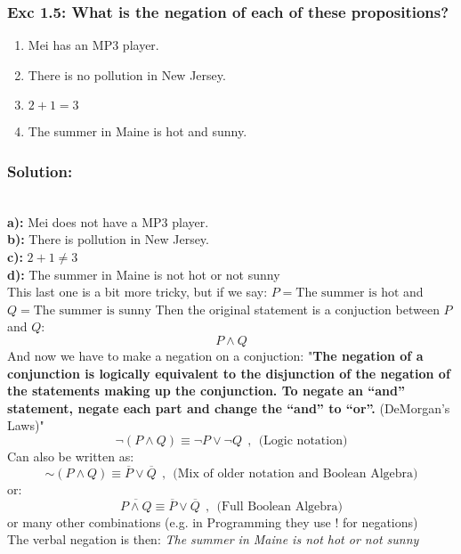 \subsubsection*{Exc 1.5: What is the negation of each of these propositions?}
\begin{enumerate}[label=(\alph*)]
\item Mei has an MP3 player.
\item There is no pollution in New Jersey.
\item $2 + 1 = 3$
\item The summer in Maine is hot and sunny.
\end{enumerate}
\subsubsection*{Solution:}
\\
\textbf{a):} Mei does not have a MP3 player.
\\
\textbf{b):} There is pollution in New Jersey.
\\
\textbf{c):} $2 + 1 \neq 3$
\\
\textbf{d):} The summer in Maine is not hot or not sunny
\\ This last one is a bit more tricky, but if we say:
$P = \text{The summer is hot}$ and 
$Q = \text{The summer is sunny}$
Then the original statement is a conjuction between $P$ and $Q$:
\begin{equation*}
P \land Q    
\end{equation*}
And now we have to make a negation on a conjuction:
"\textbf{The negation of a conjunction is logically equivalent to the disjunction of the negation of the statements making up the conjunction. To negate an “and” statement, negate each part and change the “and” to “or”.} (DeMorgan's Laws)"
\begin{equation*}
\neg \left(P \land Q  \right) \equiv \neg P \lor \neg Q   \ \ , \ \ \text{(Logic notation)}
\end{equation*}
Can also be written as:
\begin{equation*}
\sim \left(P \land Q  \right) \equiv \overline{P} \lor \overline{Q} \ \ , \ \ \text{(Mix of older notation and Boolean Algebra)}
\end{equation*}
or: 
\begin{equation*}
\overline{P \land Q} \equiv \overline{P} \lor \overline{Q} \ \ , \ \ \text{(Full Boolean Algebra)}
\end{equation*}
or many other combinations (e.g. in Programming they use ! for negations)
\\ The verbal negation is then: \textit{The summer in Maine is not hot or not sunny}

